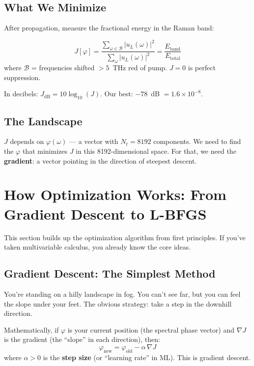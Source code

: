 \documentclass[12pt,a4paper]{article}
\begin{document}
\subsection{What We Minimize}

After propagation, measure the fractional energy in the Raman band:
\begin{keyeq}
\begin{equation}
J[\varphi] = \frac{\displaystyle\sum_{\omega\in\mathcal{B}}|u_L(\omega)|^2}{\displaystyle\sum_\omega |u_L(\omega)|^2} = \frac{E_{\text{band}}}{E_{\text{total}}}
\label{eq:cost}
\end{equation}
where $\mathcal{B}$ = frequencies shifted $> 5$~THz red of pump. $J = 0$ is perfect suppression.
\end{keyeq}

In decibels: $J_{\text{dB}} = 10\log_{10}(J)$. Our best: $-78$~dB $= 1.6\times10^{-8}$.

\subsection{The Landscape}

$J$ depends on $\varphi(\omega)$ --- a vector with $N_t = 8192$ components. We need to find the $\varphi$ that minimizes $J$ in this 8192-dimensional space. For that, we need the \textbf{gradient}: a vector pointing in the direction of steepest descent.


\section{How Optimization Works: From Gradient Descent to L-BFGS}

This section builds up the optimization algorithm from first principles. If you've taken multivariable calculus, you already know the core ideas.

\subsection{Gradient Descent: The Simplest Method}

You're standing on a hilly landscape in fog. You can't see far, but you can feel the slope under your feet. The obvious strategy: take a step in the downhill direction.

Mathematically, if $\varphi$ is your current position (the spectral phase vector) and $\nabla J$ is the gradient (the ``slope'' in each direction), then:
\begin{equation}
\varphi_{\text{new}} = \varphi_{\text{old}} - \alpha\,\nabla J
\label{eq:gd}
\end{equation}
where $\alpha > 0$ is the \textbf{step size} (or ``learning rate'' in ML). This is gradient descent.
\end{document}
